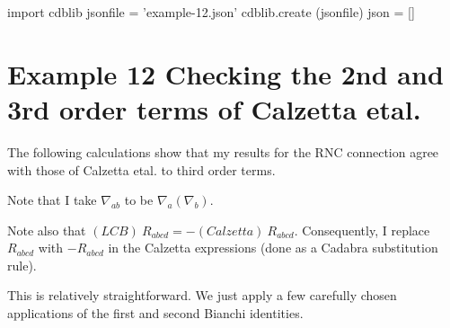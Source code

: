 \documentclass[12pt]{cdblatex}
\begin{document}
\bgroup
{}
\begin{cadabra}
   import cdblib
   jsonfile = 'example-12.json'
   cdblib.create (jsonfile)
   json = []
\end{cadabra}
\egroup

\clearpage

\section*{Example 12 Checking the 2nd and 3rd order terms of Calzetta etal.}

The following calculations show that my results for the RNC connection agree with those of Calzetta etal. to third order terms.

Note that I take $\nabla_{ab}$ to be $\nabla_a\left(\nabla_b\right)$.

Note also that $(LCB)\>R_{abcd} = - (Calzetta)\> R_{abcd}$. Consequently, I replace $R_{abcd}$ with
$-R_{abcd}$ in the Calzetta expressions (done as a Cadabra substitution rule).

This is relatively straightforward. We just apply a few carefully chosen applications of the first and second Bianchi identities.

\clearpage
\end{document}
